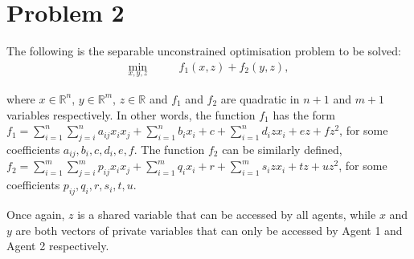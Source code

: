 \documentclass[12pt]{article}
\begin{document}
	
	
\section*{Problem 2}

The following is the separable unconstrained optimisation problem to be solved:
\begin{align*}
\min_{x,y,z}\qquad& f_1(x,z)+f_2(y,z),
\end{align*}

where $x\in\mathbb{R}^n$, $y\in\mathbb{R}^m$, $z\in\mathbb{R}$ and $f_1$ and $f_2$ are quadratic in $n+1$ and $m+1$ variables respectively. In other words, the function $f_1$ has the form $f_1=\sum\limits_{i=1}^n \sum\limits_{j=i}^n a_{ij}x_ix_j + \sum\limits_{i=1}^n b_ix_i+c+\sum\limits_{i=1}^n d_izx_i+ez+fz^2$, for some coefficients $a_{ij},b_i,c,d_i,e,f$. The function $f_2$ can be similarly defined, $f_2=\sum\limits_{i=1}^m \sum\limits_{j=i}^m p_{ij}x_ix_j + \sum\limits_{i=1}^m q_ix_i+r+\sum\limits_{i=1}^m s_izx_i+tz+uz^2$, for some coefficients $p_{ij},q_i,r,s_i,t,u$.

Once again, $z$ is a shared variable that can be accessed by all agents, while $x$ and $y$ are both vectors of private variables that can only be accessed by Agent 1 and Agent 2 respectively.
\end{document}
